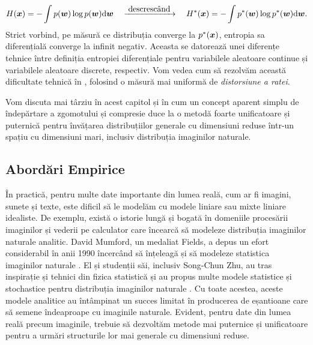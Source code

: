 \documentclass[../../book-main_ro.tex]{subfiles}
\begin{document}
\begin{equation}
H(\bm{x}) = - \int p(\boldsymbol{w}) \log p(\boldsymbol{w}) \mathrm{d}\boldsymbol{w}  \quad \xrightarrow{\hspace{1mm} \mbox{descrescând} \hspace{1mm}} \quad H^*(\bm{x}) = - \int p^*(\boldsymbol{w}) \log p^*(\boldsymbol{w}) \mathrm{d}\boldsymbol{w}.
\end{equation}
Strict vorbind, pe măsură ce distribuția converge la $p^*(\bm{x})$, entropia sa diferențială converge la infinit negativ. Aceasta se datorează unei diferențe tehnice între definiția entropiei diferențiale pentru variabilele aleatoare continue și variabilele aleatoare discrete, respectiv. Vom vedea cum să rezolvăm această dificultate tehnică în , folosind o măsură mai uniformă de {\em distorsiune a ratei}.


Vom discuta mai târziu în acest capitol și în  cum un concept aparent simplu de îndepărtare a zgomotului și compresie duce la o metodă foarte unificatoare și puternică pentru învățarea distribuțiilor generale cu dimensiuni reduse într-un spațiu cu dimensiuni mari, inclusiv distribuția imaginilor naturale.

\subsection{Abordări Empirice}
În practică, pentru multe date importante din lumea reală, cum ar fi imagini, sunete și texte, este dificil să le modelăm cu modele liniare sau mixte liniare idealiste. De exemplu, există o istorie lungă și bogată în domeniile procesării imaginilor și vederii pe calculator care încearcă să modeleze distribuția imaginilor naturale analitic. David Mumford, un medaliat Fields, a depus un efort considerabil în anii 1990 încercând să înțeleagă și să modeleze statistica imaginilor naturale \cite{Mumford1996TheSD}. El și studenții săi, inclusiv Song-Chun Zhu, au tras inspirație și tehnici din fizica statistică și au propus multe modele statistice și stochastice pentru distribuția imaginilor naturale \cite{Zhu-Entropy-1997,Zhu1997LearningGP,Zhu1997Prior,Huang-Mumford,Mumford-1999,Lee-Mumford}. Cu toate acestea, aceste modele analitice au întâmpinat un succes limitat în producerea de eșantioane care să semene îndeaproape cu imaginile naturale. Evident, pentru date din lumea reală precum imaginile, trebuie să dezvoltăm metode mai puternice și unificatoare pentru a urmări structurile lor mai generale cu dimensiuni reduse.
\end{document}
